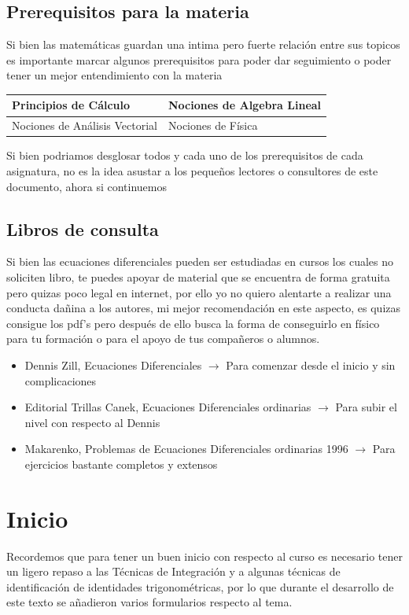 \documentclass[10pt,executivepaper]{article}
\begin{document}
\subsection{Prerequisitos para la materia}
Si bien las matemáticas guardan una intima pero fuerte relación entre sus topicos es importante marcar algunos prerequisitos para poder dar seguimiento o poder tener un mejor entendimiento con la materia
\begin{center}
  \begin{tabular}{|p{5.5cm}|p{5.5cm}|}
    \hline
    Principios de Cálculo & Nociones de Algebra Lineal\\
    \hline
    Nociones de Análisis Vectorial & Nociones de Física\\
    \hline
  \end{tabular}
\end{center}
Si bien podriamos desglosar todos y cada uno de los prerequisitos de cada asignatura, no es la idea asustar a los pequeños lectores o consultores de este documento, ahora si continuemos

\subsection{Libros de consulta}
Si bien las ecuaciones diferenciales pueden ser estudiadas en cursos los cuales no soliciten libro, te puedes apoyar de material que se encuentra de forma gratuita pero quizas poco legal en internet, por ello yo no quiero alentarte a realizar una conducta dañina a los autores, mi mejor recomendación en este aspecto, es quizas consigue los pdf's pero después de ello busca la forma de conseguirlo en físico para tu formación o para el apoyo de tus compañeros o alumnos.
\begin{itemize}
  \item Dennis Zill, Ecuaciones Diferenciales $\rightarrow$ Para comenzar desde el inicio y sin complicaciones
  \item Editorial Trillas Canek, Ecuaciones Diferenciales ordinarias $\rightarrow$ Para subir el nivel con respecto al Dennis
  \item Makarenko, Problemas de Ecuaciones Diferenciales ordinarias 1996 $\rightarrow$ Para ejercicios bastante completos y extensos
\end{itemize}

\section{Inicio}
Recordemos que para tener un buen inicio con respecto al curso es necesario tener un ligero repaso a las Técnicas de Integración y a algunas técnicas de identificación de identidades trigonométricas, por lo que durante el desarrollo de este texto se añadieron varios formularios respecto al tema.
\end{document}
